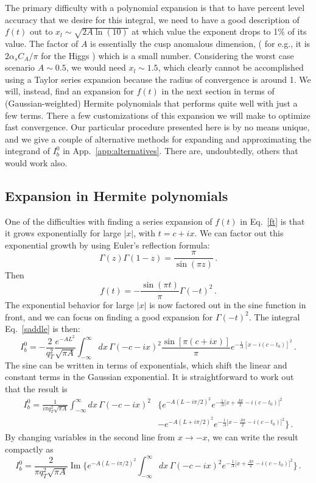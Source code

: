 \documentclass[a4,letterpaper,11pt]{article}
\newcommand{\nn}{\nonumber}
\newcommand{\be}{\begin{equation}}
\newcommand{\ee}{\end{equation}}
\newcommand{\abs}[1]{\left\lvert #1\right\rvert}
\newcommand{\eq}[1]{Eq.~\eqref{#1}}
\newcommand{\appx}[1]{App.~\ref{app:#1}}
\DeclareMathOperator{\Imag}{Im}
\begin{document}
The primary difficulty with a polynomial expansion is that to have  percent level accuracy that we desire for this integral, we need to have a good description of $f(t)$ out to $x_l \sim \sqrt{2 A\ln(10)}$ at which value the exponent drops to 1\% of its value. The factor of $A$ is essentially the cusp anomalous dimension, ( for e.g., it is $ 2 \alpha_s C_A /\pi $ for the Higgs ) which is a small number. Considering the worst case scenario $ A \sim 0.5$, we would need $x_l \sim 1.5$, which clearly cannot be accomplished using a Taylor series expansion because the radius of convergence is around 1. We will, instead, find an expansion for $f(t)$ in the next section in terms of (Gaussian-weighted) Hermite polynomials that performs quite well with just a few terms. There a few customizations of this expansion we will make to optimize fast convergence. Our particular procedure presented here is by no means unique, and we give a couple of alternative methods for expanding and approximating the integrand of $I_b^0$ in \appx{alternatives}. There are, undoubtedly, others that would work also.
			


\subsection{Expansion in Hermite polynomials}
\label{HStrategy}

One of the difficulties with finding a series expansion of $f(t)$ in \eq{ft} is that it grows exponentially for large $\abs{x}$, with $t=c+ix$. We can factor out this exponential growth by using Euler's reflection formula:
\be
\label{Euler}
\Gamma(z)\Gamma(1-z) = \frac{\pi}{\sin(\pi z)}\,.
\ee
Then
\be
\label{ftfactored}
f(t) = -\frac{\sin(\pi t)}{\pi}\Gamma(-t)^2\,.
\ee
The exponential behavior for large $\abs{x}$ is now factored out in the sine function in front, and we can focus on finding a good expansion for $\Gamma(-t)^2$. The integral \eq{saddle} is then:
\be
I_b^0 = -\frac{2}{q_T^2}\frac{e^{-AL^2}}{\sqrt{\pi A}} \int_{-\infty}^\infty dx\,\Gamma(-c-ix)^2 \frac{\sin[\pi(c+i x)]}{\pi} e^{-\frac{1}{A}[x - i(c-t_0)]^2}\,.
\ee
The sine can be written in terms of exponentials, which shift the linear and constant terms in the Gaussian exponential. It is straightforward to work out that the result is
\begin{align}
I_b^0 = \frac{1}{i\pi q_T^2\sqrt{\pi A}}  \int_{-\infty}^\infty dx\,  \Gamma(-c-ix)^2 &\biggl\{e^{-A(L - i\pi/2)^2} e^{-\frac{1}{A}\bigl[x + \frac{A\pi}{2} - i(c-t_0)\bigr]^2} \\
& -e^{-A(L + i\pi/2)^2}  e^{-\frac{1}{A}\bigl[x - \frac{A\pi}{2} - i(c-t_0)\bigr]^2} \biggr\} \,. \nn
\end{align}
By changing variables in the second line from $x\to -x$, we can write the result compactly as
\be
\label{Ibimag}
I_b^0  = \frac{2}{\pi q_T^2\sqrt{\pi A}} \Imag\biggl\{ e^{-A(L-i\pi/2)^2} \int_{-\infty}^\infty dx\, \Gamma(-c-ix)^2 e^{-\frac{1}{A}\bigl[ x + \frac{A\pi}{2} - i(c-t_0)\bigr]^2}\biggr\}\,.
\ee
\end{document}
